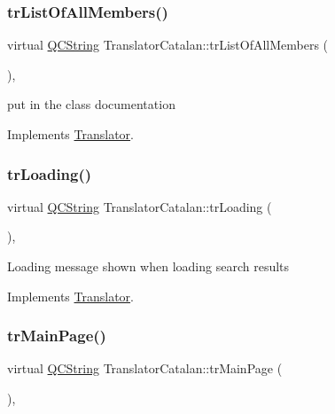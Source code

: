 \subsubsection{\texorpdfstring{trListOfAllMembers()}{trListOfAllMembers()}}
{\footnotesize\ttfamily virtual \mbox{\hyperlink{class_q_c_string}{Q\+C\+String}} Translator\+Catalan\+::tr\+List\+Of\+All\+Members (\begin{DoxyParamCaption}{ }\end{DoxyParamCaption})\hspace{0.3cm}{\ttfamily [inline]}, {\ttfamily [virtual]}}

put in the class documentation 

Implements \mbox{\hyperlink{class_translator}{Translator}}.

\mbox{\label{class_translator_catalan_adec9f771b481b77eb110ceeccd702811}} 
\subsubsection{\texorpdfstring{trLoading()}{trLoading()}}
{\footnotesize\ttfamily virtual \mbox{\hyperlink{class_q_c_string}{Q\+C\+String}} Translator\+Catalan\+::tr\+Loading (\begin{DoxyParamCaption}{ }\end{DoxyParamCaption})\hspace{0.3cm}{\ttfamily [inline]}, {\ttfamily [virtual]}}

Loading message shown when loading search results 

Implements \mbox{\hyperlink{class_translator}{Translator}}.

\mbox{\label{class_translator_catalan_a6c7e6b3ca4eb9835fe6856e66f5eddd0}} 
\subsubsection{\texorpdfstring{trMainPage()}{trMainPage()}}
{\footnotesize\ttfamily virtual \mbox{\hyperlink{class_q_c_string}{Q\+C\+String}} Translator\+Catalan\+::tr\+Main\+Page (\begin{DoxyParamCaption}{ }\end{DoxyParamCaption})\hspace{0.3cm}{\ttfamily [inline]}, {\ttfamily [virtual]}}

